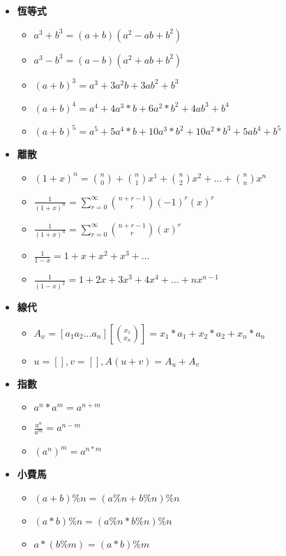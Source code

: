 \begin{itemize}
  \item \textbf{恆等式}
  \begin{itemize}
    \item $a^3+b^3 = (a+b)(a^2-ab+b^2)$
    \item $a^3-b^3 = (a-b)(a^2+ab+b^2)$
    \item $(a+b)^3 = a^3+3a^2b+3ab^2+b^3$
    \item $(a+b)^4 = a^4+4a^3*b+6a^2*b^2+4ab^3+b^4$
    \item $(a+b)^5 = a^5+5a^4*b+10a^3*b^2+10a^2*b^3+5ab^4+b^5$
  \end{itemize}

\item \textbf{離散}
  \begin{itemize}
    \item $(1+x)^n = \binom{n}{0} + \binom{n}{1}x^1 + \binom{n}{2}x^2 + ...+\binom{n}{n}x^n$
    \item $\frac{1}{(1+x)^n} = \sum \limits_{r=0}^\infty \binom{n+r-1}{r}(-1)^r(x)^r$
    \item $\frac{1}{(1+x)^n} = \sum \limits_{r=0}^\infty \binom{n+r-1}{r}(x)^r$
    \item $\frac{1}{1-x} = 1+x+x^2+x^3+...$
    \item $\frac{1}{(1-x)^2} = 1+2x+3x^3+4x^4+...+nx^{n-1}$
  \end{itemize}
  
\item \textbf{線代}
  \begin{itemize}
    \item $A_x = [a_1 a_2 ... a_n][\binom{x_1}{x_n}] = x_1*a_1+x_2*a_2+x_n*a_n$
    \item $u=[], v=[], A(u+v) = A_u+A_v$
  \end{itemize}

  \item \textbf{指數}
  \begin{itemize}
    \item $a^n*a^m = a^{n+m}$
    \item $\frac{a^n}{a^m} = a^{n-m}$
    \item $(a^n)^m = a^{n*m}$
  \end{itemize}

  \item \textbf{小費馬}
  \begin{itemize}
    \item $(a+b)\%n = (a\%n+b\%n)\%n$
    \item $(a*b)\%n = (a\%n*b\%n)\%n$
    \item $a*(b\%m) = (a*b)\%m$
  \end{itemize}
\end{itemize}
